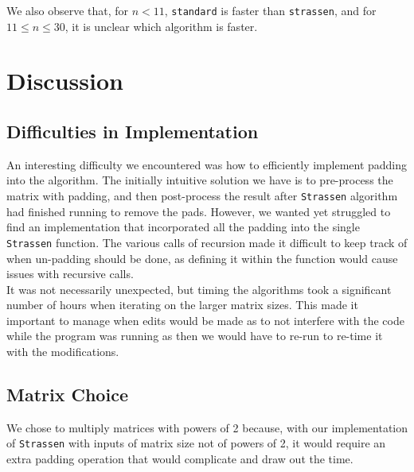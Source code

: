\documentclass[11pt]{scrartcl}
\theoremstyle{dotlessP}
\theoremstyle{dotlessN}
\theoremstyle{dotN}
\begin{document}
We also observe that, for $n < 11$, \texttt{standard} is faster than \texttt{strassen}, and for $11 \leq n \leq 30$, it is unclear which algorithm is faster.
\section{Discussion}
\subsection{Difficulties in Implementation}
An interesting difficulty we encountered was how to efficiently implement padding into the algorithm. The initially intuitive solution we have is to pre-process the matrix with padding, and then post-process the result after \texttt{Strassen} algorithm had finished running to remove the pads. However, we wanted yet struggled to find an implementation that incorporated all the padding into the single \texttt{Strassen} function. The various calls of recursion made it difficult to keep track of when un-padding should be done, as defining it within the function would cause issues with recursive calls. \\

It was not necessarily unexpected, but timing the algorithms took a significant number of hours when iterating on the larger matrix sizes. This made it important to manage when edits would be made as to not interfere with the code while the program was running as then we would have to re-run to re-time it with the modifications.  \\

\subsection{Matrix Choice}


We chose to multiply matrices with powers of 2 because, with our implementation of \texttt{Strassen} with inputs of matrix size not of powers of 2, it would require an extra padding operation that would complicate and draw out the time.    
\end{document}
